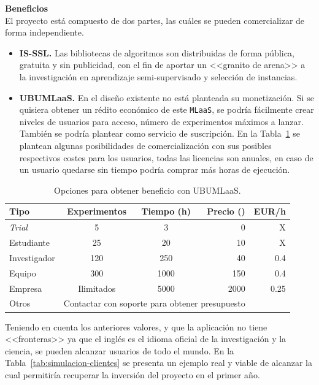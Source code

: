 \textbf{Beneficios}\\
El proyecto está compuesto de dos partes, las cuáles se pueden comercializar de forma independiente.
\begin{itemize}
\item \textbf{IS-SSL.} Las bibliotecas de algoritmos son distribuidas de forma pública, gratuita y sin publicidad, con el fin de aportar un <<granito de arena>> a la investigación en aprendizaje semi-supervisado y selección de instancias.
\item \textbf{UBUMLaaS.} En el diseño existente no está planteada su monetización. Si se quisiera obtener un rédito económico de este \texttt{MLaaS}, se podría fácilmente crear niveles de usuarios para acceso, número de experimentos máximos a lanzar. También se podría plantear como servicio de suscripción. En la Tabla~\ref{tab:opciones-beneficio} se plantean algunas posibilidades de comercialización con sus posibles respectivos costes para los usuarios, todas las licencias son anuales, en caso de un usuario quedarse sin tiempo podría comprar más horas de ejecución.
\end{itemize}

\begin{table}[H]
\centering
\begin{tabular}{lccrr}
	\toprule
	\textbf{Tipo}          &\textbf{Experimentos} & \textbf{Tiempo (h)} & \textbf{Precio (\officialeuro)} &  EUR/h\\
	\midrule
	\textit{Trial}        & 5 & 3 & 0 & X\\
	Estudiante   & 25 & 20 & 10 & X\\
	Investigador  & 120 & 250 & 40 & 0.4 \\
	Equipo  & 300 & 1000 & 150 & 0.4 \\
	Empresa & Ilimitados & 5000 & 2000 & 0.25 \\
	Otros & \multicolumn{3}{c}{Contactar con soporte para obtener presupuesto} \\
	\bottomrule
\end{tabular}
\caption{Opciones para obtener beneficio con UBUMLaaS.}\label{tab:opciones-beneficio}
\end{table}

Teniendo en cuenta los anteriores valores, y que la aplicación no tiene <<fronteras>> ya que el inglés es el idioma oficial de la investigación y la ciencia, se pueden alcanzar usuarios de todo el mundo. En la Tabla~\ref{tab:simulacion-clientes} se presenta un ejemplo real y viable de alcanzar la cual permitiría recuperar la inversión del proyecto en el primer año.

